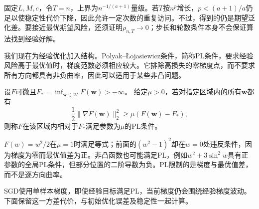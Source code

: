 固定$L,M,c$，令$T=n$，上界为$n^{-1/(a+1)}$量级。若$T$按$n^p$增长，$p<(a+1)/a$仍足以使稳定性代价下降，因此允许一定次数的重复访问。不过，得到的仍是期望泛化差。要接近最优期望风险，还须证明$\rho_{n,T}\to0$；步长和轮数条件本身不会保证算法找到经验好解。

我们现在为经验优化加入结构。Polyak--\L{}ojasiewicz条件，简称PL条件，要求经验风险高于最优值时，梯度范数必须相应较大。它排除高损失的零梯度点，而不要求所有方向都具有非负曲率，因此可以适用于某些非凸问题。

\begin{definition}[PL条件]
\label{def:pl-condition}
设$F$可微且$F_* =\inf_{\bm w\in\mathcal W}F(\bm w)>-\infty$。
给定$\mu>0$，若对指定区域内的所有$\bm w$都有
\[
 \frac12\|\nabla F(\bm w)\|_2^2\geq\mu(F(\bm w)-F_*),
\]
则称$F$在该区域内相对于$F_*$满足参数为$\mu$的PL条件。
\end{definition}

$F(w)=w^2/2$在$\mu=1$时满足等式；前面的$(w^2-1)^2$却在$w=0$处违反条件，因为梯度为零而最优值差为正。非凸函数也可能满足PL，例如$w^2+3\sin^2w$具有正参数的全局PL条件，但部分位置的二阶导数为负。PL限制的是梯度与最优值差，而不是逐方向曲率。

SGD使用单样本梯度，即使经验目标满足PL，当前梯度仍会围绕经验梯度波动。下面保留这一方差代价，与初始优化误差及稳定性一起计算。

